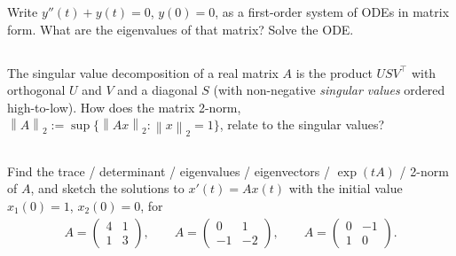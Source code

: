\documentclass[12pt,a4paper]{article}
\newcommand{\norm}[1]{\left\|#1\right\|}
\begin{document}
    Write $y''(t) + y(t) = 0$, $y(0) = 0$,
    as a first-order system of ODEs in matrix form.
    What are the eigenvalues of that matrix?
    Solve the ODE.

    \subsection{}

    The singular value decomposition of a real matrix $A$
    is the product $U S V^\top$ 
    with orthogonal $U$ and $V$
    and 
    a diagonal $S$ 
    (with non-negative \emph{singular values} ordered high-to-low).
    How does the matrix 2-norm,
    $
        \norm{ A }_2
        :=
        \sup \{ \norm{ A x }_2 : \norm{x}_2 = 1 \}
    $,
    relate to the singular values?
    
    \subsection{}
    
    Find the 
    trace / determinant / eigenvalues / eigenvectors / $\exp(t A)$ / 2-norm
    of $A$,
    and
    sketch the solutions
    to $x'(t) = A x(t)$
    with the initial value
    $x_1(0) = 1$, $x_2(0) = 0$,
    for
    \begin{align*}
        A = 
        \begin{pmatrix}
            4 & 1 \\ 1 & 3
        \end{pmatrix}
        ,
        \qquad
        A = 
        \begin{pmatrix}
            0 & 1 \\ -1 & -2
        \end{pmatrix}
        ,
        \qquad
        A = 
        \begin{pmatrix}
            0 & -1 \\ 1 & 0
        \end{pmatrix}
        .
    \end{align*}
    
    \subsection{}
    
\end{document}
